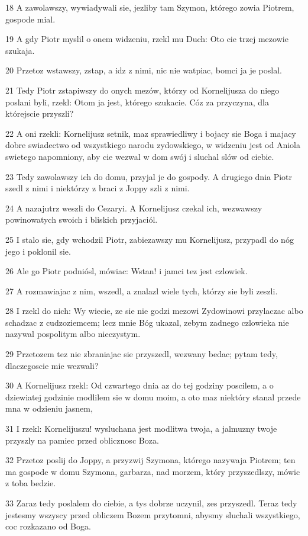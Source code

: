 \par 18 A zawolawszy, wywiadywali sie, jezliby tam Szymon, którego zowia Piotrem, gospode mial.
\par 19 A gdy Piotr myslil o onem widzeniu, rzekl mu Duch: Oto cie trzej mezowie szukaja.
\par 20 Przetoz wstawszy, zstap, a idz z nimi, nic nie watpiac, bomci ja je poslal.
\par 21 Tedy Piotr zstapiwszy do onych mezów, którzy od Kornelijusza do niego poslani byli, rzekl: Otom ja jest, którego szukacie. Cóz za przyczyna, dla którejscie przyszli?
\par 22 A oni rzekli: Kornelijusz setnik, maz sprawiedliwy i bojacy sie Boga i majacy dobre swiadectwo od wszystkiego narodu zydowskiego, w widzeniu jest od Aniola swietego napomniony, aby cie wezwal w dom swój i sluchal slów od ciebie.
\par 23 Tedy zawolawszy ich do domu, przyjal je do gospody. A drugiego dnia Piotr szedl z nimi i niektórzy z braci z Joppy szli z nimi.
\par 24 A nazajutrz weszli do Cezaryi. A Kornelijusz czekal ich, wezwawszy powinowatych swoich i bliskich przyjaciól.
\par 25 I stalo sie, gdy wchodzil Piotr, zabiezawszy mu Kornelijusz, przypadl do nóg jego i poklonil sie.
\par 26 Ale go Piotr podniósl, mówiac: Wstan! i jamci tez jest czlowiek.
\par 27 A rozmawiajac z nim, wszedl, a znalazl wiele tych, którzy sie byli zeszli.
\par 28 I rzekl do nich: Wy wiecie, ze sie nie godzi mezowi Zydowinowi przylaczac albo schadzac z cudzoziemcem; lecz mnie Bóg ukazal, zebym zadnego czlowieka nie nazywal pospolitym albo nieczystym.
\par 29 Przetozem tez nie zbraniajac sie przyszedl, wezwany bedac; pytam tedy, dlaczegoscie mie wezwali?
\par 30 A Kornelijusz rzekl: Od czwartego dnia az do tej godziny poscilem, a o dziewiatej godzinie modlilem sie w domu moim, a oto maz niektóry stanal przede mna w odzieniu jasnem,
\par 31 I rzekl: Kornelijuszu! wysluchana jest modlitwa twoja, a jalmuzny twoje przyszly na pamiec przed oblicznosc Boza.
\par 32 Przetoz poslij do Joppy, a przyzwij Szymona, którego nazywaja Piotrem; ten ma gospode w domu Szymona, garbarza, nad morzem, który przyszedlszy, mówic z toba bedzie.
\par 33 Zaraz tedy poslalem do ciebie, a tys dobrze uczynil, zes przyszedl. Teraz tedy jestesmy wszyscy przed obliczem Bozem przytomni, abysmy sluchali wszystkiego, coc rozkazano od Boga.

